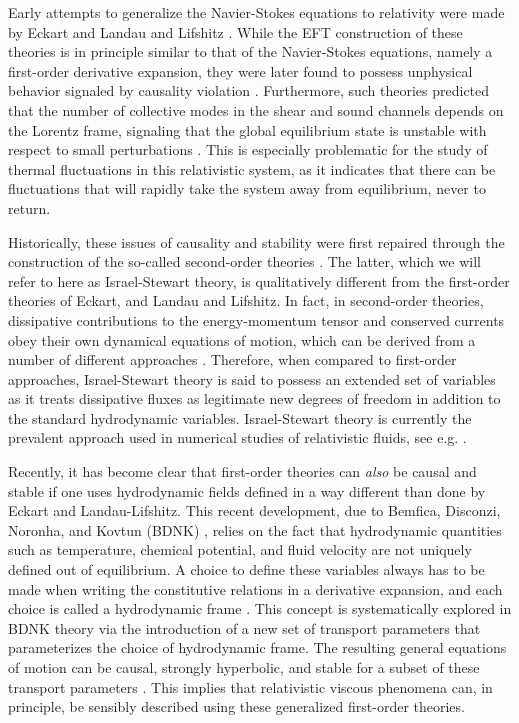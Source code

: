 \documentclass[aps,prd,nofootinbib,amsmath,amssymb,showpacs,longbibliography,singlecolumn,superscriptaddress,notitlepage]{revtex4-1}
\theoremstyle{plain}
\theoremstyle{definition}
\begin{document}
Early attempts to generalize the Navier-Stokes equations to relativity were made by Eckart \cite{PhysRev.58.919} and Landau and Lifshitz \cite{Landau1987Fluid}. While the EFT construction of these theories is in principle similar to that of the Navier-Stokes equations, namely a first-order derivative expansion, they were later found to possess unphysical behavior signaled by causality violation \cite{PichonViscous}. Furthermore, such theories predicted that the number of collective modes in the shear and sound channels depends on the Lorentz frame, signaling that the global equilibrium state is unstable with respect to small perturbations \cite{Hiscock:1985zz}. This is especially problematic for the study of thermal fluctuations in this relativistic system, as it indicates that there can be fluctuations that will rapidly take the system away from equilibrium, never to return.

Historically, these issues of causality and stability were first repaired through the construction of the so-called second-order theories \cite{1967ZPhy..198..329M, MIS-2,MIS-6}. The latter, which we will refer to here as Israel-Stewart theory, is qualitatively different from the first-order theories of Eckart, and Landau and Lifshitz. In fact, in second-order theories, dissipative contributions to the energy-momentum tensor and conserved currents obey their own dynamical equations of motion, which can be derived from a number of different approaches \cite{MIS-6, Baier:2007ix, Denicol:2012cn, MuellerRuggeriBook, JouetallBook,GavassinoGENERIC2022}. Therefore, when compared to first-order approaches, Israel-Stewart theory is said to possess an extended set of variables as it treats dissipative fluxes as legitimate new degrees of freedom in addition to the standard hydrodynamic variables. Israel-Stewart theory is currently the prevalent approach used in numerical studies of relativistic fluids, see e.g. \cite{Romatschke:2017ejr}.  

Recently, it has become clear that first-order theories can \emph{also} be causal and stable if one uses hydrodynamic fields defined in a way different than done by Eckart and Landau-Lifshitz. This recent development, due to Bemfica, Disconzi, Noronha, and Kovtun (BDNK) \cite{BemficaDisconziNoronha, Kovtun:2019hdm, Bemfica:2019knx, Hoult:2020eho,Bemfica:2020zjp}, relies on the fact \cite{MIS-2,MIS-6} that hydrodynamic quantities such as temperature, chemical potential, and fluid velocity are not uniquely defined out of equilibrium. A choice to define these variables always has to be made when writing the constitutive relations in a derivative expansion, and each choice is called a hydrodynamic frame \cite{Kovtun:2012rj}. This concept is systematically explored in BDNK theory via the introduction of a new set of transport parameters that parameterizes the choice of hydrodynamic frame. The resulting general equations of motion can be causal, strongly hyperbolic, and stable for a subset of these transport parameters \cite{BemficaDisconziNoronha, Kovtun:2019hdm, Bemfica:2019knx, Hoult:2020eho, Bemfica:2020zjp, Abboud:2023hos}. This implies that relativistic viscous phenomena can, in principle, be sensibly described using these generalized first-order theories. 
\end{document}
